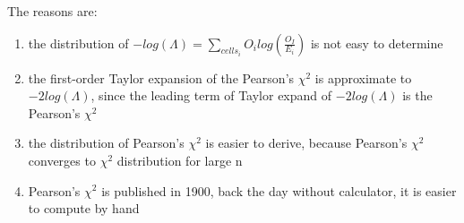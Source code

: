 \documentclass[12pt ]{article}
\begin{document}
The reasons are:
\begin{enumerate}
\item the distribution of $-log(\Lambda) = \sum_{cells_{i}} O_{i} log(\frac{O_{I}}{E_{i}})$ is not easy to determine
\item the first-order Taylor expansion of the Pearson's $\chi^2$ is approximate to $-2log(\Lambda)$, since the leading term of Taylor expand of $-2log(\Lambda)$ is the Pearson's $\chi^2$
\item the distribution of Pearson's $\chi^2$ is easier to derive, because Pearson's $\chi^2$ converges to $\chi^2$ distribution for large n
\item  Pearson's $\chi^2$ is published in 1900, back the day without calculator, it is easier to compute by hand
\end{enumerate}
\end{document}

